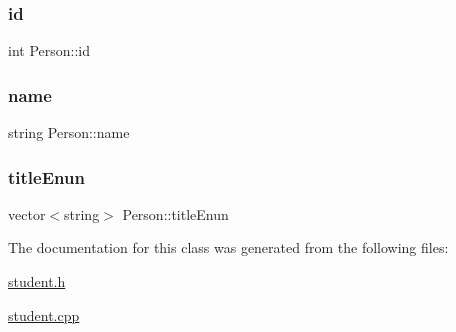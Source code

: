 \subsubsection{\texorpdfstring{id}{id}}
{\footnotesize\ttfamily int Person\+::id\hspace{0.3cm}{\ttfamily [protected]}}

\mbox{\label{class_person_a669b64897b4d823a27bb5866368d4dfa}} 
\subsubsection{\texorpdfstring{name}{name}}
{\footnotesize\ttfamily string Person\+::name\hspace{0.3cm}{\ttfamily [protected]}}

\mbox{\label{class_person_a162c1e6b3ce254b6bbffc0e947943031}} 
\subsubsection{\texorpdfstring{title\+Enun}{titleEnun}}
{\footnotesize\ttfamily vector$<$string$>$ Person\+::title\+Enun\hspace{0.3cm}{\ttfamily [protected]}}



The documentation for this class was generated from the following files\+:\begin{DoxyCompactItemize}
\item 
\hyperlink{student_8h}{student.\+h}\item 
\hyperlink{student_8cpp}{student.\+cpp}\end{DoxyCompactItemize}
